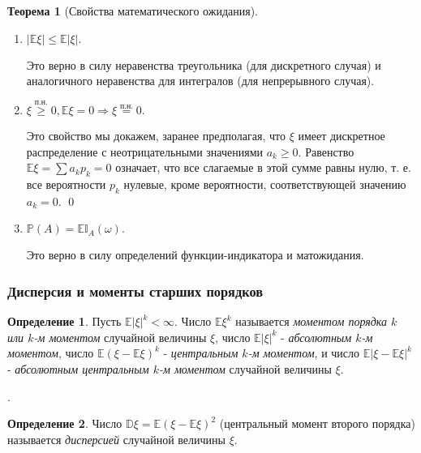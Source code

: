 \documentclass[oneside,final,14pt]{extreport}
\newcommand\myprob[1]{{\mathbb{P}(#1)}}
\renewenvironment{proof}{{\bfseries Доказательство.}}{\qed}
\theoremstyle{plain}
\theoremstyle{definition}
\newtheorem*{defn}{Определение}
\newtheorem*{rmrk}{Замечание}
\theoremstyle{named}
\newtheorem*{namedthm}{Теорема}
\begin{document}
\begin{namedthm}[Свойства математического ожидания]
\begin{enumerate}
    \begin{rmrk}
        Обратное неверно: из равенства $\mathbb{E}(\xi \eta) = \mathbb{E}\xi \mathbb{E} \eta$ {\it не следует} независимость величин $\xi$ и $\eta$.
    \end{rmrk} 
    \item $|\mathbb{E}\xi| \leqslant \mathbb{E}|\xi|.$
    
    Это верно в силу неравенства треугольника (для дискретного случая) и аналогичного неравенства для интегралов (для непрерывного случая).
    \item $\xi \overset{\text{п.н.}}{\geqslant} 0, \mathbb{E}\xi = 0 \Rightarrow \xi \overset{\text{п.н.}}{=} 0.$
    
    \begin{proof}
    Это свойство мы докажем, заранее предполагая, что $\xi$ имеет дискретное распределение с неотрицательными значениями $a_k \geqslant 0$. Равенство $\mathbb{E}\xi = \sum a_k p_k = 0$ означает, что все слагаемые в этой сумме равны нулю, т. е. все вероятности $p_k$ нулевые, кроме вероятности, соответствующей значению $a_k = 0$.
    \end{proof}
    \item $\myprob{A} = \mathbb{E}\mathbb{I}_A(\omega).$
    
    Это верно в силу определений функции-индикатора и матожидания.
\end{enumerate}
\end{namedthm}

\subsubsection{Дисперсия и моменты старших порядков}

\begin{defn}
    Пусть $\mathbb{E}|\xi|^k < \infty.$ Число $\mathbb{E}\xi^k$ называется {\it моментом порядка $k$ или $k$-м моментом} случайной величины $\xi$, число $\mathbb{E}|\xi|^k$ - {\it абсолютным $k$-м моментом}, число $\mathbb{E}(\xi - \mathbb{E}\xi)^k$ - {\it центральным $k$-м моментом}, и число $\mathbb{E}|\xi - \mathbb{E}\xi|^k$ - {\it абсолютным центральным $k$-м моментом} случайной величины $\xi$.
\end{defn}. 

\begin{defn}
    Число $\mathbb{D}\xi = \mathbb{E}(\xi - \mathbb{E}\xi)^2$ (центральный момент второго порядка) называется {\it дисперсией} случайной величины $\xi$.
\end{defn} 
\end{document}
